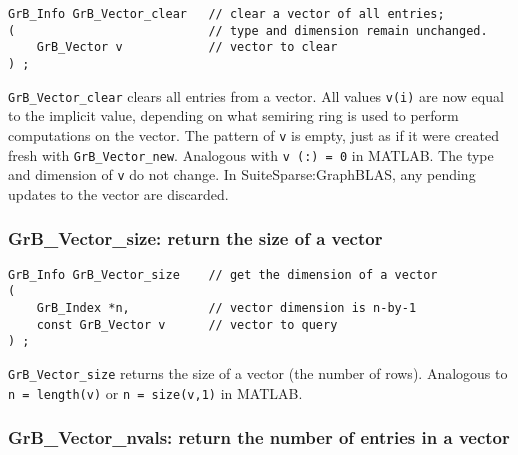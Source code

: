 \documentclass[12pt]{article}
\begin{document}
\begin{mdframed}[userdefinedwidth=6in]
{\footnotesize
\begin{verbatim}
GrB_Info GrB_Vector_clear   // clear a vector of all entries;
(                           // type and dimension remain unchanged.
    GrB_Vector v            // vector to clear
) ;
\end{verbatim}
} \end{mdframed}

\verb'GrB_Vector_clear' clears all entries from a vector.  All values
\verb'v(i)' are now equal to the implicit value, depending on what semiring
ring is used to perform computations on the vector.  The pattern of \verb'v' is
empty, just as if it were created fresh with \verb'GrB_Vector_new'.  Analogous
with \verb'v (:) = 0' in MATLAB.  The type and dimension of \verb'v' do not
change.  In SuiteSparse:GraphBLAS, any pending updates to the vector are
discarded.

\newpage
\subsubsection{{\sf GrB\_Vector\_size:}          return the size of a vector}
\label{vector_size}

\begin{mdframed}[userdefinedwidth=6in]
{\footnotesize
\begin{verbatim}
GrB_Info GrB_Vector_size    // get the dimension of a vector
(
    GrB_Index *n,           // vector dimension is n-by-1
    const GrB_Vector v      // vector to query
) ;
\end{verbatim}
} \end{mdframed}

\verb'GrB_Vector_size' returns the size of a vector (the number of rows).
Analogous to \verb'n = length(v)' or \verb'n = size(v,1)' in MATLAB.

\subsubsection{{\sf GrB\_Vector\_nvals:}         return the number of entries in a vector}
\label{vector_nvals}
\end{document}
